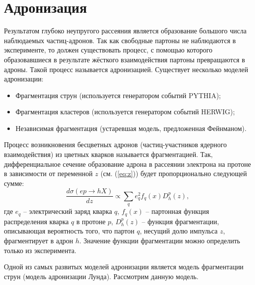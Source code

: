 \documentclass{extarticle}
\begin{document}
\newpage

\section{Адронизация}
Результатом глубоко неупругого рассеяния является образование большого числа наблюдаемых частиц-адронов. Так как свободные партоны не наблюдаются в эксперименте, то должен существовать процесс, с помощью которого образовавшиеся в результате жёсткого взаимодействия партоны превращаются в адроны. Такой процесс называется адронизацией. Существует несколько моделей адронизации:
\begin{itemize}
\item Фрагментация струн (используется генератором событий PYTHIA);
\item Фрагментация кластеров (используется генератором событий HERWIG);
\item Независимая фрагментация (устаревшая модель, предложенная Фейнманом).
\end{itemize}
 
Процесс возникновения бесцветных адронов (частиц-участников ядерного взаимодействия) из цветных кварков называется фрагментацией. Так, дифференциальное сечение образование адрона в рассеянии электрона на протоне в зависимости от переменной $z$ (см. (\ref{eq:z})) будет пропорционально следующей сумме:
\begin{equation}
	\frac{d\sigma(ep \rightarrow hX)}{dz} \propto \sum_q e_q^2 f_q (x) D_h^p(z),
\end{equation}
где $e_q$ -- электрический заряд кварка $q$, $f_q (x)$ -- партонная функция распределения кварка $q$ в протоне $p$, $D_h^p(z)$ -- функция фрагментации, описывающая вероятность того, что партон $q$, несущий долю импульса $z$, фрагментирует в адрон $h$. Значение функции фрагментации можно определить только из эксперимента.

Одной из самых развитых моделей адронизации является модель фрагментации струн (модель адронизации Лунда). Рассмотрим данную модель.
\end{document}
